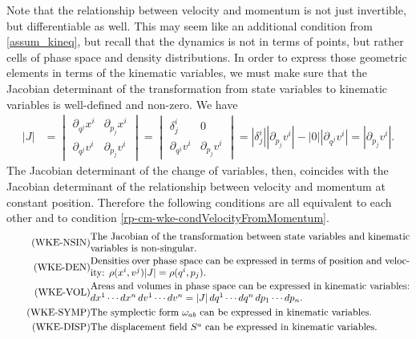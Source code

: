 Note that the relationship between velocity and momentum is not just invertible, but differentiable as well. This may seem like an additional condition from \ref{assum_kineq}, but recall that the dynamics is not in terms of points, but rather cells of phase space and density distributions. In order to express those geometric elements in terms of the kinematic variables, we must make sure that the Jacobian determinant of the transformation from state variables to kinematic variables is well-defined and non-zero. We have
\begin{equation}\label{rp-cm-JacobianMomentumVelocity}
	\begin{aligned}
		|J| &= \begin{vmatrix}
			\partial_{q^j} x^i & \partial_{p_j} x^i  \\
			\partial_{q^j} v^i & \partial_{p_j} v^i
		\end{vmatrix}
		= \begin{vmatrix}
			\delta^i_j & 0 \\
			\partial_{q^j} v^i & \partial_{p_j} v^i
		\end{vmatrix} 
		= \left|\delta^i_j\right| \left|\partial_{p_j} v^i\right| - |0| \left|\partial_{q^j} v^i\right| = \left|\partial_{p_j} v^i\right|.
	\end{aligned}
\end{equation}
The Jacobian determinant of the change of variables, then, coincides with the Jacobian determinant of the relationship between velocity and momentum at constant position. Therefore the following conditions are all equivalent to each other and to condition \ref{rp-cm-wke-condVelocityFromMomentum}.
\begin{align}
	\tag{WKE-NSIN}\label{rp-cm-wke-condJacobianNonSingular}
	&\eqtext{The Jacobian of the transformation between state variables and kinematic variables is non-singular.} \\
	\tag{WKE-DEN}\label{rp-cm-wke-condDensities}
	&\eqtext{Densities over phase space can be expressed in terms of position and velocity: $\rho(x^i, v^j) |J| = \rho(q^i, p_j)$.} \\
	\tag{WKE-VOL}\label{rp-cm-wke-condAreas}
	&\eqtext{Areas and volumes in phase space can be expressed in kinematic variables: $dx^1 \cdots dx^n \, dv^1 \cdots dv^n = |J| \, dq^1 \cdots dq^n \, dp_1 \cdots dp_n$.} \\
	\tag{WKE-SYMP}\label{rp-cm-wke-condSymplectic}
	&\eqtext{The symplectic form $\omega_{ab}$ can be expressed in kinematic variables.} \\
	\tag{WKE-DISP}\label{rp-cm-wke-condDisplacement}
	&\eqtext{The displacement field $S^a$ can be expressed in kinematic variables.}
\end{align}


